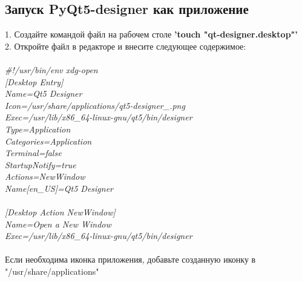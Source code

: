 \documentclass[a4paper, 12px]{article}
\begin{document}
\subsection{Запуск PyQt5-designer как приложение}
1. Создайте командой файл на рабочем столе \textbf{'touch "qt-designer.desktop"'} \\
2. Откройте файл в редакторе и внесите следующее содержимое:\\\\
\textit{\#!/usr/bin/env xdg-open}\\
\textit{[Desktop Entry]}\\
\textit{Name=Qt5 Designer}\\
\textit{Icon=/usr/share/applications/qt5-designer\_.png}\\
\textit{Exec=/usr/lib/x86\_64-linux-gnu/qt5/bin/designer}\\
\textit{Type=Application}\\
\textit{Categories=Application}\\
\textit{Terminal=false}\\
\textit{StartupNotify=true}\\
\textit{Actions=NewWindow}\\
\textit{Name[en\_US]=Qt5 Designer}\\\\
\textit{[Desktop Action NewWindow]}\\
\textit{Name=Open a New Window}\\
\textit{Exec=/usr/lib/x86\_64-linux-gnu/qt5/bin/designer}\\\\
Если необходима иконка приложения, добавьте созданную иконку в "/usr/share/applications"
\end{document}
